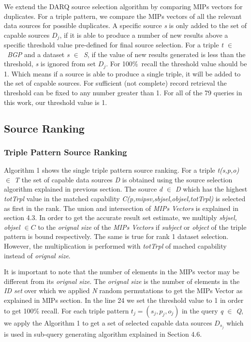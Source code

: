 \documentclass{sig-alternate}  %
\begin{document}
We extend the DARQ source selection algorithm by comparing MIPs vectors
 for duplicates. For a triple pattern, we compare the MIPs
vectors of all the relevant data sources for possible duplicates.
A specific source \emph{s} is only added to the set of capable sources $D_j$,
if it is able to produce a number of new results above a specific threshold value
pre-defined for final source selection. For a triple \emph{t $\in$\ BGP} and a dataset \emph{s $\in$\ S}, if the value of new results generated
is less than the threshold, \emph{s} is ignored from set $D_j$. For 100\%\ recall the threshold value should be 1. Which means if a source is able to produce a single triple, it will be added to the set of capable sources. For sufficient (not complete) record retrieval the threshold can be fixed to any number greater than 1. For all of the 79 queries in this work, our threshold value is 1. 

\subsection{Source Ranking} 
\subsubsection{Triple Pattern Source Ranking}
Algorithm 1 shows the single triple pattern source ranking. For a triple \emph{t(s,p,o) $\in$ T } the set of capable data sources \emph{D} is obtained using the source selection algorithm explained in previous section. The source \emph{d $\in$ D} which has the highest \emph{totTrpl} value in the matched capability \emph{C(p,mipsv,sbjsel,objsel,totTrpl)} is selected as first in the rank. The union and intersection of \emph{MIPs Vectors} is explained in section 4.3. In order to get the accurate result set estimate, we multiply \emph{sbjsel, objsel $\in C$} to the \emph{orignal size} of the \emph{MIPs Vectors} if \emph{subject} or \emph{object} of the triple pattern is bound respectively. The same is true for rank 1 dataset selection. However, the multiplication is performed with \emph{totTrpl} of mached capability instead of \emph{orignal size}. 

It is important to note that the number of elements in the MIPs vector may be different from its \emph{orignal size}. The \emph{orignal size} is the number of elements in the \emph{ID set} over which we applied \emph{N} random permutations to get the MIPs Vector as explained in MIPs section. In the line 24 we set the threshold value to 1 in order to get 100\% recall. For each triple pattern $t_j = (s_j, p_j, o_j)$ in the query \emph{q} $\in$ \emph{Q}, we apply the Algorithm 1 to get a set of selected capable data sources \emph{$D_{s_j}$} which is used in sub-query generating algorithm explained in Section 4.6.
\end{document}
